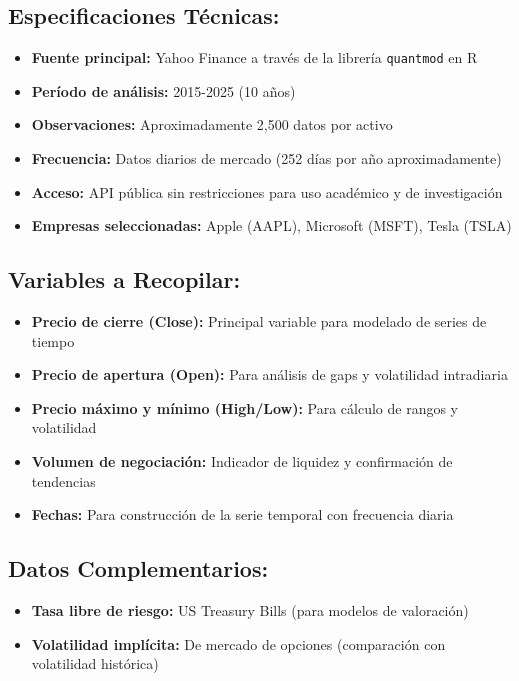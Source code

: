 \documentclass[
]{book}
\providecommand{\tightlist}{%
  \setlength{\itemsep}{0pt}\setlength{\parskip}{0pt}}
\begin{document}
\subsection{Especificaciones Técnicas:}\label{especificaciones-tuxe9cnicas}

\begin{itemize}
\tightlist
\item
  \textbf{Fuente principal:} Yahoo Finance a través de la librería \texttt{quantmod} en R
\item
  \textbf{Período de análisis:} 2015-2025 (10 años)
\item
  \textbf{Observaciones:} Aproximadamente 2,500 datos por activo
\item
  \textbf{Frecuencia:} Datos diarios de mercado (252 días por año aproximadamente)
\item
  \textbf{Acceso:} API pública sin restricciones para uso académico y de investigación
\item
  \textbf{Empresas seleccionadas:} Apple (AAPL), Microsoft (MSFT), Tesla (TSLA)
\end{itemize}

\subsection{Variables a Recopilar:}\label{variables-a-recopilar}

\begin{itemize}
\tightlist
\item
  \textbf{Precio de cierre (Close):} Principal variable para modelado de series de tiempo
\item
  \textbf{Precio de apertura (Open):} Para análisis de gaps y volatilidad intradiaria
\item
  \textbf{Precio máximo y mínimo (High/Low):} Para cálculo de rangos y volatilidad
\item
  \textbf{Volumen de negociación:} Indicador de liquidez y confirmación de tendencias
\item
  \textbf{Fechas:} Para construcción de la serie temporal con frecuencia diaria
\end{itemize}

\subsection{Datos Complementarios:}\label{datos-complementarios}

\begin{itemize}
\tightlist
\item
  \textbf{Tasa libre de riesgo:} US Treasury Bills (para modelos de valoración)
\item
  \textbf{Volatilidad implícita:} De mercado de opciones (comparación con volatilidad histórica)
\end{itemize}
\end{document}
